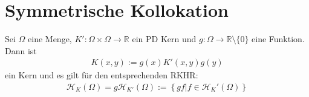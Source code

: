 \section{Symmetrische Kollokation}
\begin{theorem}
\label{thm:gewichtKern}
Sei $\Omega$ eine Menge, $K':\Omega \times \Omega \rightarrow \mathbb{R}$ ein \ac{PD} Kern und $g:\Omega \rightarrow \mathbb{R} \setminus \{0\}$ eine Funktion. Dann ist 
\begin{align*}
K(x,y) := g(x)K'(x,y)g(y)
\end{align*}
ein Kern und es gilt für den entsprechenden \ac{RKHR}:
\begin{align*}
\mathcal{H}_{K}(\Omega) = g \mathcal{H}_{K'}(\Omega) := \left\{ gf|f \in \mathcal{H}_K'(\Omega)\right\}
\end{align*}
\end{theorem}
